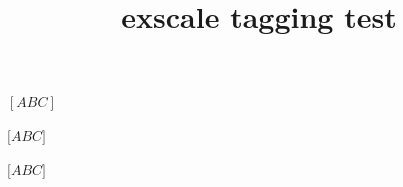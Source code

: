 \documentclass{article}
\title{exscale tagging test}
\begin{document}
$[ABC]$

$\Big[ABC\Big]$

$\big[ABC\big]$
\end{document}
